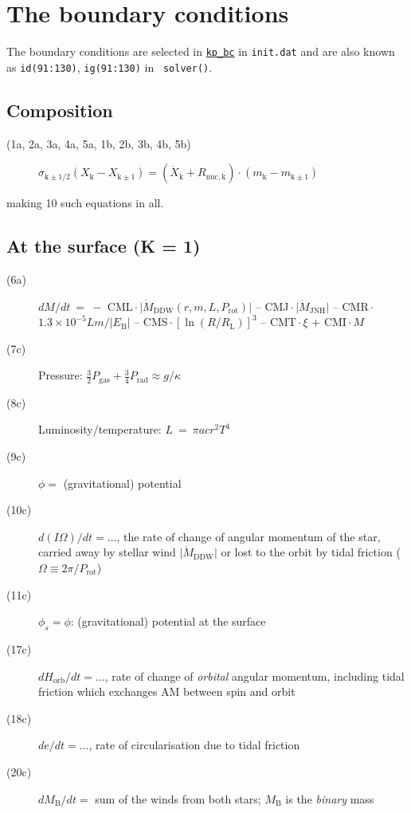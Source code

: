 \hypertarget{boundcs}{}
\section{The boundary conditions}
\label{sec:boundcs}

\def\mdtddw{{\vert\dot{M}_\mathrm{DDW}}}
\def\mdtjnh{{\vert\dot{M}_\mathrm{JNH}\vert}}
\def\mdtrlf{{\vert\dot{M}_\mathrm{RLOF}\vert}}
\def\pip{\,$\cdot$\,}


The boundary conditions are selected in \hyperlink{kp_bc}{\texttt{kp\_bc}} in \texttt{init.dat}
and are also known as \texttt{id(91:130)}, \texttt{ig(91:130)} in \eg\ \texttt{solver()}.


\subsection{Composition}
\begin{description}
\item[(1a, 2a, 3a, 4a, 5a, 1b, 2b, 3b, 4b, 5b)]
\item[]  $\sigma_{\mathrm{k} \pm 1/2}(X_\mathrm{k } - X_{\mathrm{k}\pm 1}) = (\dot{X}_\mathrm{k } + R_\mathrm{nuc, k }) \cdot (m_\mathrm{k } - m_{\mathrm{k}\pm 1})$ 
\end{description}
\noindent making 10 such equations in all.


\subsection{At the surface (K = 1)}
\begin{description}
\item[(6a)] $dM/dt\ =\ -$ CML\pip$\mdtddw(r,m,L,P_\mathrm{rot})\vert$ -- CMJ\pip$\mdtjnh$ -- CMR\pip$1.3\times 10^{-5}Lm/ \vert E_\mathrm{B}\vert$ 
                      -- CMS\pip$[\ln(R/R_\mathrm{L})]^3$ -- CMT\pip$\xi$ + CMI\pip$M$

\item[(7c)]  Pressure: $\frac{3}{2} P_\mathrm{gas} + \frac{3}{4} P_\mathrm{rad} \approx g/\kappa$
\item[(8c)]  Luminosity/temperature: $L \  = \  \pi a c r^2 T^4$

\item[(9c)]  $\phi = $ (gravitational) potential
\item[(10c)] $d(I\Omega)/dt = \ldots$, the rate of change of angular momentum of the star, carried away by stellar wind $\mdtddw\vert$ or lost to the orbit by tidal 
             friction ($\Omega\equiv 2\pi/P_\mathrm{rot}$)
\item[(11c)] $\phi_s= \phi$: (gravitational) potential at the surface
\item[(17c)] $dH_\mathrm{orb}/dt= \ldots$, rate of change of \emph{orbital} angular momentum, including tidal friction which exchanges AM between spin and orbit
\item[(18c)] $de/dt =\ldots$, rate of circularisation due to tidal friction
\item[(20c)] $dM_\mathrm{B}/dt =$ sum of the winds from both stars; $M_\mathrm{B}$ is the \emph{binary} mass
\end{description}


